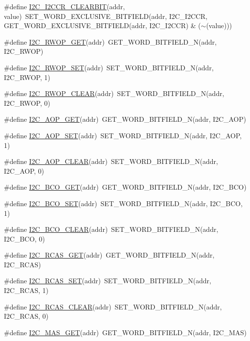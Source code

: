 \begin{DoxyCompactItemize}
\item 
\#define \hyperlink{a00557_a4c22cbe1a177546f33e4296ec7c6f1b7}{I2C\_\-I2CCR\_\-CLEARBIT}(addr, value)~SET\_\-WORD\_\-EXCLUSIVE\_\-BITFIELD(addr, I2C\_\-I2CCR, GET\_\-WORD\_\-EXCLUSIVE\_\-BITFIELD(addr, I2C\_\-I2CCR) \& ($\sim$(value)))
\item 
\#define \hyperlink{a00557_a10684a1b0667ecf54bcdbf057dfb5cbf}{I2C\_\-RWOP\_\-GET}(addr)~GET\_\-WORD\_\-BITFIELD\_\-N(addr, I2C\_\-RWOP)
\item 
\#define \hyperlink{a00557_a5a950fb1fa612890885c4ac64b367bfe}{I2C\_\-RWOP\_\-SET}(addr)~SET\_\-WORD\_\-BITFIELD\_\-N(addr, I2C\_\-RWOP, 1)
\item 
\#define \hyperlink{a00557_a9ee2809f7dffd805ef13ca1a00990bf8}{I2C\_\-RWOP\_\-CLEAR}(addr)~SET\_\-WORD\_\-BITFIELD\_\-N(addr, I2C\_\-RWOP, 0)
\item 
\#define \hyperlink{a00557_ab418dc6ee3f64159c412fc98d27e866e}{I2C\_\-AOP\_\-GET}(addr)~GET\_\-WORD\_\-BITFIELD\_\-N(addr, I2C\_\-AOP)
\item 
\#define \hyperlink{a00557_adb0d7b5581fadd10e44b3f1e760ca06d}{I2C\_\-AOP\_\-SET}(addr)~SET\_\-WORD\_\-BITFIELD\_\-N(addr, I2C\_\-AOP, 1)
\item 
\#define \hyperlink{a00557_a766df40e32affbcd213e8a69d81a7db2}{I2C\_\-AOP\_\-CLEAR}(addr)~SET\_\-WORD\_\-BITFIELD\_\-N(addr, I2C\_\-AOP, 0)
\item 
\#define \hyperlink{a00557_aa25ca95618e07481409413545e64f068}{I2C\_\-BCO\_\-GET}(addr)~GET\_\-WORD\_\-BITFIELD\_\-N(addr, I2C\_\-BCO)
\item 
\#define \hyperlink{a00557_ae0317af97485573bf70c59d547aec4ba}{I2C\_\-BCO\_\-SET}(addr)~SET\_\-WORD\_\-BITFIELD\_\-N(addr, I2C\_\-BCO, 1)
\item 
\#define \hyperlink{a00557_a64d527aeb4e475b188d59493c4fd5ab7}{I2C\_\-BCO\_\-CLEAR}(addr)~SET\_\-WORD\_\-BITFIELD\_\-N(addr, I2C\_\-BCO, 0)
\item 
\#define \hyperlink{a00557_a640014c27b2834f376cc482f847ec5c6}{I2C\_\-RCAS\_\-GET}(addr)~GET\_\-WORD\_\-BITFIELD\_\-N(addr, I2C\_\-RCAS)
\item 
\#define \hyperlink{a00557_a50eb6d27bc38281b31c421f3c47ce364}{I2C\_\-RCAS\_\-SET}(addr)~SET\_\-WORD\_\-BITFIELD\_\-N(addr, I2C\_\-RCAS, 1)
\item 
\#define \hyperlink{a00557_a394992b0631d8b5120984de42b1392f6}{I2C\_\-RCAS\_\-CLEAR}(addr)~SET\_\-WORD\_\-BITFIELD\_\-N(addr, I2C\_\-RCAS, 0)
\item 
\#define \hyperlink{a00557_a3342a2d9077b3370426e419b476b9ed6}{I2C\_\-MAS\_\-GET}(addr)~GET\_\-WORD\_\-BITFIELD\_\-N(addr, I2C\_\-MAS)

\end{DoxyCompactItemize}
